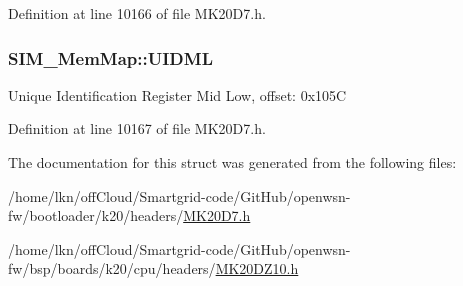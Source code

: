 Definition at line 10166 of file M\+K20\+D7.\+h.

\subsubsection[{\texorpdfstring{U\+I\+D\+ML}{UIDML}}]{ S\+I\+M\+\_\+\+Mem\+Map\+::\+U\+I\+D\+ML}\hypertarget{struct_s_i_m___mem_map_a51e871d8ac13db8b605b6ec1b3292be4}{}\label{struct_s_i_m___mem_map_a51e871d8ac13db8b605b6ec1b3292be4}
Unique Identification Register Mid Low, offset\+: 0x105C 

Definition at line 10167 of file M\+K20\+D7.\+h.



The documentation for this struct was generated from the following files\+:\begin{DoxyCompactItemize}
\item 
/home/lkn/off\+Cloud/\+Smartgrid-\/code/\+Git\+Hub/openwsn-\/fw/bootloader/k20/headers/\hyperlink{bootloader_2k20_2headers_2_m_k20_d7_8h}{M\+K20\+D7.\+h}\item 
/home/lkn/off\+Cloud/\+Smartgrid-\/code/\+Git\+Hub/openwsn-\/fw/bsp/boards/k20/cpu/headers/\hyperlink{_m_k20_d_z10_8h}{M\+K20\+D\+Z10.\+h}\end{DoxyCompactItemize}
